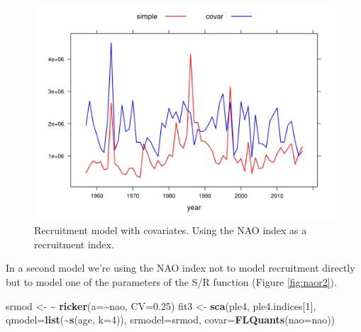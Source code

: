 \documentclass[
]{book}
\newenvironment{Shaded}{\begin{snugshade}}{\end{snugshade}}
\newcommand{\AttributeTok}[1]{\textcolor[rgb]{0.13,0.29,0.53}{#1}}
\newcommand{\DecValTok}[1]{\textcolor[rgb]{0.00,0.00,0.81}{#1}}
\newcommand{\ErrorTok}[1]{\textcolor[rgb]{0.64,0.00,0.00}{\textbf{#1}}}
\newcommand{\FloatTok}[1]{\textcolor[rgb]{0.00,0.00,0.81}{#1}}
\newcommand{\FunctionTok}[1]{\textcolor[rgb]{0.13,0.29,0.53}{\textbf{#1}}}
\newcommand{\NormalTok}[1]{#1}
\newcommand{\OtherTok}[1]{\textcolor[rgb]{0.56,0.35,0.01}{#1}}
\newcommand{\SpecialCharTok}[1]{\textcolor[rgb]{0.81,0.36,0.00}{\textbf{#1}}}
\begin{document}
\begin{figure}
\centering
\includegraphics{_bookdown_files/_main_files/figure-html/naor-1.png}
\caption{\label{fig:naor}Recruitment model with covariates. Using the NAO index as a recruitment index.}
\end{figure}

In a second model we're using the NAO index not to model recruitment directly but to model one of the parameters of the S/R function (Figure \ref{fig:naor2}).

\begin{Shaded}
\begin{Highlighting}[]
\NormalTok{srmod }\OtherTok{\textless{}{-}} \ErrorTok{\textasciitilde{}} \FunctionTok{ricker}\NormalTok{(}\AttributeTok{a=}\SpecialCharTok{\textasciitilde{}}\NormalTok{nao, }\AttributeTok{CV=}\FloatTok{0.25}\NormalTok{)}
\NormalTok{fit3 }\OtherTok{\textless{}{-}} \FunctionTok{sca}\NormalTok{(ple4, ple4.indices[}\DecValTok{1}\NormalTok{], }\AttributeTok{qmodel=}\FunctionTok{list}\NormalTok{(}\SpecialCharTok{\textasciitilde{}}\FunctionTok{s}\NormalTok{(age, }\AttributeTok{k=}\DecValTok{4}\NormalTok{)), }\AttributeTok{srmodel=}\NormalTok{srmod,}
       \AttributeTok{covar=}\FunctionTok{FLQuants}\NormalTok{(}\AttributeTok{nao=}\NormalTok{nao))}
\end{Highlighting}
\end{Shaded}
\end{document}
